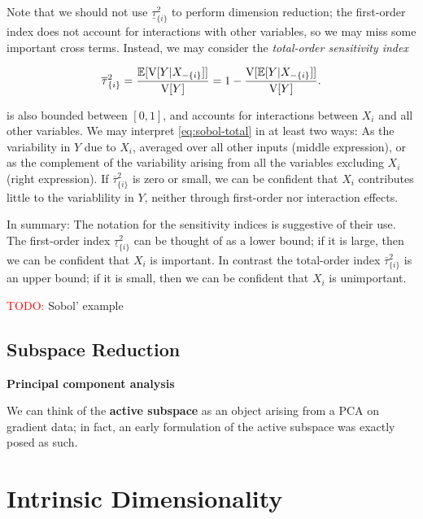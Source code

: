 \documentclass{article}
\begin{document}
Note that we should not use \(\underline{\tau}_{\{i\}}^2\) to perform dimension
reduction; the first-order index does not account for interactions with other
variables, so we may miss some important cross terms. Instead, we may consider
the \emph{total-order sensitivity index}

\begin{equation}\label{eq:sobol-total}
  \overline{\tau}_{\{i\}}^2 = \frac{\E[\V[Y|X_{-\{i\}}]]}{\V[Y]} = %
  1 - \frac{\V[\E[Y|X_{-\{i\}}]]}{\V[Y]}.
\end{equation}

\noindent {} is also bounded between \([0,1]\), and accounts
for interactions between \(X_i\) and all other variables. We may interpret
\eqref{eq:sobol-total} in at least two ways: As the variability in \(Y\) due to
\(X_i\), averaged over all other inputs (middle expression), or as the complement
of the variability arising from all the variables excluding \(X_i\) (right
expression). If \(\overline{\tau}_{\{i\}}^2\) is zero or small, we can be
confident that \(X_i\) contributes little to the variablility in \(Y\), neither
through first-order nor interaction effects.

In summary: The notation for the sensitivity indices is suggestive of their use.
The first-order index \(\underline{\tau}_{\{i\}}^2\) can be thought of as a
lower bound; if it is large, then we can be confident that \(X_i\) is important.
In contrast the total-order index \(\overline{\tau}_{\{i\}}^2\) is an upper
bound; if it is small, then we can be confident that \(X_i\) is unimportant.

\textcolor{red}{TODO:} Sobol' example

\subsection{Subspace Reduction}
\textbf{Principal component analysis}

We can think of the \textbf{active subspace} as an object arising from a PCA on
gradient data; in fact, an early formulation of the active subspace was exactly
posed as such.\cite{russi2010uncertainty}

\section{Intrinsic Dimensionality}



\end{document}
